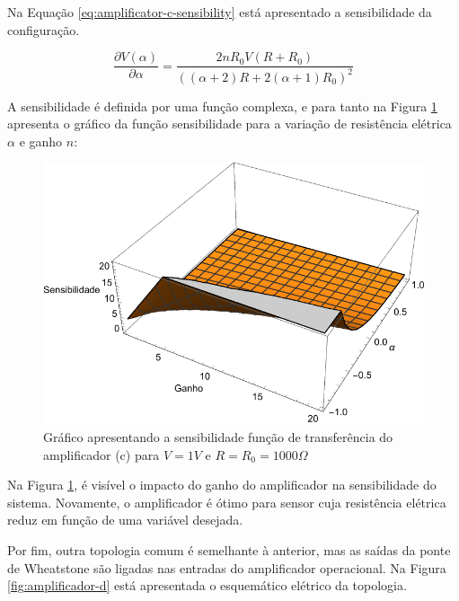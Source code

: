 \documentclass[a4paper]{instrumentacao}
\begin{document}
Na Equação \ref{eq:amplificator-c-sensibility} está apresentado a sensibilidade da configuração.

\begin{equation}
	\frac{\partial V(\alpha)}{\partial \alpha} = \frac{2 n R_0 V (R+R_0)}{((\alpha +2) R+2 (\alpha +1) R_0)^2}
	\label{eq:amplificator-c-sensibility}
\end{equation}

A sensibilidade é definida por uma função complexa, e para tanto na Figura  \ref{fig:amplificador-c-sensibilidade} apresenta o gráfico da função sensibilidade para a variação de resistência elétrica $\alpha$ e ganho $n$:

\begin{figure}[H]
\center
\includegraphics[width=\textwidth]{Amplificador-C-Sensibility.pdf}
\caption{Gráfico apresentando a sensibilidade função de transferência do amplificador (c) para $V=1V$ e $R = R_0 = 1000\Omega$}
\label{fig:amplificador-c-sensibilidade}
\end{figure}

Na Figura \ref{fig:amplificador-c-sensibilidade}, é visível o impacto do ganho do amplificador na sensibilidade do sistema. Novamente, o amplificador é ótimo para sensor cuja resistência elétrica reduz em função de uma variável desejada.


Por fim, outra topologia comum é semelhante à anterior, mas as saídas da ponte de Wheatstone são ligadas nas entradas do amplificador operacional. Na Figura \ref{fig:amplificador-d} está apresentada o esquemático elétrico da topologia.
\end{document}
